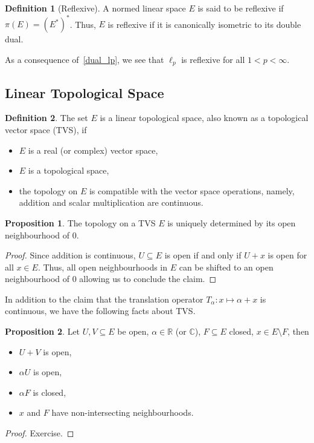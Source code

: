\documentclass[]{article}
\theoremstyle{definition}
\theoremstyle{definition}
\newtheorem{definition}{Definition}[section]
\newtheorem{proposition}{Proposition}[section]
\begin{document}
\begin{definition}[Reflexive]
  A normed linear space \(E\) is said to be reflexive if \(\pi(E) = (E^*)^*\).
  Thus, \(E\) is reflexive if it is canonically isometric to its double dual.
\end{definition}

As a consequence of~\ref{dual_lp}, we see that \(\ell_p\) is reflexive for 
all \(1 < p < \infty\).

\subsection{Linear Topological Space}

\begin{definition}
  The set \(E\) is a linear topological space, also known as a topological 
  vector space (TVS), if 
  \begin{itemize}
    \item \(E\) is a real (or complex) vector space, 
    \item \(E\) is a topological space,
    \item the topology on \(E\) is compatible with the vector space operations, 
      namely, addition and scalar multiplication are continuous.
  \end{itemize}
\end{definition}

\begin{proposition}
  The topology on a TVS \(E\) is uniquely determined by its open neighbourhood 
  of 0.
\end{proposition}
\begin{proof}
  Since addition is continuous, \(U \subseteq E\) is open if and only if 
  \(U + x\) is open for all \(x \in E\). Thus, all open neighbourhoods in 
  \(E\) can be shifted to an open neighbourhood of 0 allowing us to conclude 
  the claim.
\end{proof}

In addition to the claim that the translation operator 
\(T_\alpha : x \mapsto \alpha + x\) is continuous, we have the following 
facts about TVS.

\begin{proposition}
  Let \(U, V \subseteq E\) be open, \(\alpha \in \mathbb{R}\) (or \(\mathbb{C}\)),
  \(F \subseteq E\) closed, \(x \in E \setminus F\), then 
  \begin{itemize}
    \item \(U + V\) is open,
    \item \(\alpha U\) is open,
    \item \(\alpha F\) is closed,
    \item \(x\) and \(F\) have non-intersecting neighbourhoods.
  \end{itemize}
\end{proposition}
\begin{proof}
  Exercise.
\end{proof}
\end{document}

